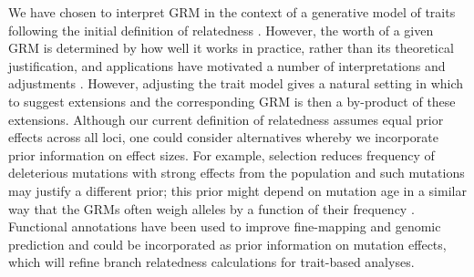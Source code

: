 We have chosen to interpret GRM in the context of a generative model of traits following 
the initial definition of relatedness \citep{wright1922coefficients}.
However, the worth of a given GRM is determined by how well it works in practice,
rather than its theoretical justification,
and applications have motivated a number of interpretations and adjustments \citep{speed2015relatedness}.
However, adjusting the trait model gives a natural setting in which
to suggest extensions and the corresponding GRM is then a by-product of these extensions.
Although our current definition of relatedness assumes equal prior effects across all loci, one could consider alternatives whereby we incorporate prior information on effect sizes. For example, selection reduces frequency of deleterious mutations with strong effects from the population and such mutations may justify a different prior;
this prior might depend on mutation age in a similar way that the GRMs often weigh alleles by a function of their frequency \citep{speed2015relatedness}.
Functional annotations have been used to improve fine-mapping and genomic prediction \citep[e.g.][]{MacLeod2016Exploiting, weissbrod2020functionally, weissbrod2022leveraging} and could be incorporated as prior information on mutation effects, which will refine branch relatedness calculations for trait-based analyses.



